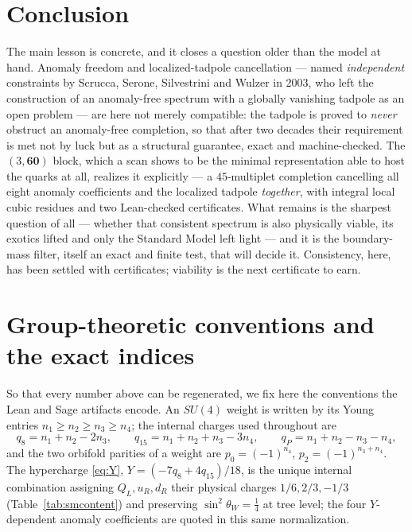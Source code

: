 \documentclass[11pt,a4paper]{article}
\begin{document}
\section{Conclusion}\label{sec:conclusion}
The main lesson is concrete, and it closes a question older than the model at hand.
Anomaly freedom and localized-tadpole cancellation --- named \emph{independent} constraints
by Scrucca, Serone, Silvestrini and Wulzer in 2003, who left the construction of an
anomaly-free spectrum with a globally vanishing tadpole as an open problem --- are here not
merely compatible: the tadpole is proved to \emph{never} obstruct an anomaly-free
completion, so that after two decades their requirement is met not by luck but as a
structural guarantee, exact and machine-checked. The $(3,\mathbf{60})$ block, which a scan
shows to be the minimal representation able to host the quarks at all, realizes it
explicitly --- a $45$-multiplet completion cancelling all eight anomaly coefficients and
the localized tadpole \emph{together}, with integral local cubic residues and two
Lean-checked certificates. What remains is the sharpest question of all --- whether that
consistent spectrum is also physically viable, its exotics lifted and only the Standard
Model left light --- and it is the boundary-mass filter, itself an exact and finite test,
that will decide it. Consistency, here, has been settled with certificates; viability is
the next certificate to earn.

\appendix
\section{Group-theoretic conventions and the exact indices}\label{app:conventions}
So that every number above can be regenerated, we fix here the conventions the Lean and
Sage artifacts encode. An $SU(4)$ weight is written by its Young entries
$n_1\ge n_2\ge n_3\ge n_4$; the internal charges used throughout are
\begin{equation}
q_8=n_1+n_2-2n_3,\qquad q_{15}=n_1+n_2+n_3-3n_4,\qquad q_P=n_1+n_2-n_3-n_4,
\end{equation}
and the two orbifold parities of a weight are $p_0=(-1)^{n_4}$, $p_2=(-1)^{n_3+n_4}$.
The hypercharge \eqref{eq:Y}, $Y=(-7q_8+4q_{15})/18$, is the unique internal combination
assigning $Q_L,u_R,d_R$ their physical charges $1/6,2/3,-1/3$ (Table~\ref{tab:smcontent})
and preserving $\sin^2\theta_W=\tfrac14$ at tree level; the four $Y$-dependent anomaly
coefficients are quoted in this same normalization.
\end{document}
